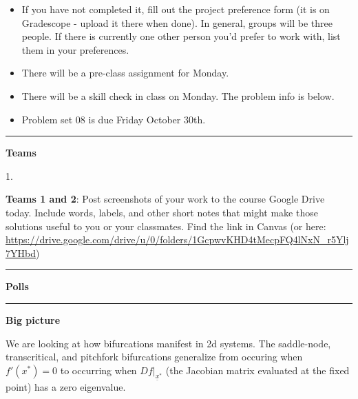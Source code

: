 \documentclass[12pt,letterpaper,noanswers]{exam}
\begin{document}
 \pdfpageheight 11in 
  \pdfpagewidth 8.5in

\noindent 




\begin{itemize}

   
    \item If you have not completed it, fill out the project preference form (it is on Gradescope - upload it there when done).  In general, groups will be three people.  If there is currently one other person you'd prefer to work with, list them in your preferences.
    \item There will be a pre-class assignment for Monday.
    \item There will be a skill check in class on Monday.  The problem info is below.
 \item Problem set 08 is due Friday October 30th.
\end{itemize}

\hrule
\vspace{0.2cm}



\noindent\textbf{Teams}

\begin{multicols}{2}
1. 
\end{multicols}

\noindent \textbf{Teams 1 and 2}: Post screenshots of your work to the course Google Drive today.  Include words, labels, and other short notes that might make those solutions useful to you or your classmates.  Find the link in Canvas (or here: \url{https://drive.google.com/drive/u/0/folders/1GcpwvKHD4tMecpFQ4lNxN_r5Ylj7YHbd})

\vspace{0.2cm}

\hrule
\vspace{0.2cm}

\noindent\textbf{Polls}


\vspace{0.2cm}

\hrule
\vspace{0.2cm}

\noindent\textbf{Big picture}

We are looking at how bifurcations manifest in 2d systems.  The saddle-node, transcritical, and pitchfork bifurcations generalize from occuring when $f'(x^*) = 0$ to occurring when $\left.Df\right\vert_{\underline x^*}$ (the Jacobian matrix evaluated at the fixed point) has a zero eigenvalue.
\end{document}
